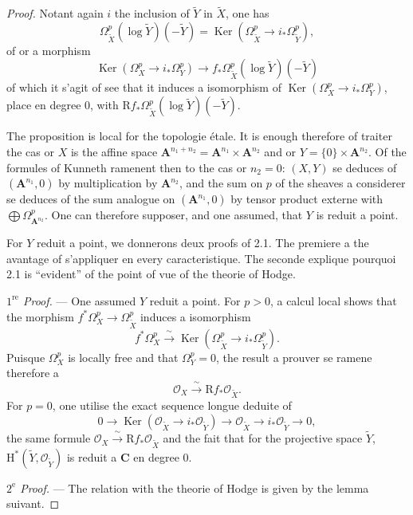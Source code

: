 \documentclass[12pt,a4paper]{article}
\theoremstyle{plain}
\theoremstyle{definition}
\DeclareMathOperator{\Ker}{Ker}
\begin{document}
\begin{proof}[Proof]
Notant again $i$ the inclusion of $\tilde{Y}$ in $\tilde{X}$, one has
\[
\Omega_{\tilde{X}}^p(\log \tilde{Y})(-\tilde{Y}) = \Ker(\Omega_{\tilde{X}}^p \to i_* \Omega_{\tilde{Y}}^p),
\]
of or a morphism
\[
\Ker(\Omega_X^p \to i_* \Omega_Y^p) \to f_* \Omega_{\tilde{X}}^p(\log \tilde{Y})(-\tilde{Y})
\]
of which it s'agit of see that it induces a isomorphism of $\Ker(\Omega_X^p \to i_* \Omega_Y^p)$, place en degree 0, with $\mathrm{R}f_* \Omega_{\tilde{X}}^p(\log \tilde{Y})(-\tilde{Y})$.

The proposition is local for the topologie étale. It is enough therefore of traiter the cas or $X$ is the affine space $\mathbf{A}^{n_1+n_2} = \mathbf{A}^{n_1} \times \mathbf{A}^{n_2}$ and or $Y = \{0\} \times \mathbf{A}^{n_2}$. Of the formules of Kunneth ramenent then to the cas or $n_2 = 0$: $(X, Y)$ se deduces of $(\mathbf{A}^{n_1}, 0)$ by multiplication by $\mathbf{A}^{n_2}$, and the sum on $p$ of the sheaves a considerer se deduces of the sum analogue on $(\mathbf{A}^{n_1}, 0)$ by tensor product externe with $\bigoplus \Omega_{\mathbf{A}^{n_2}}^p$. One can therefore supposer, and one assumed, that $Y$ is reduit a point.

For $Y$ reduit a point, we donnerons deux proofs of 2.1. The premiere a the avantage of s'appliquer en every caracteristique. The seconde explique pourquoi 2.1 is ``evident'' of the point of vue of the theorie of Hodge.

\smallskip
\textit{$1^{\text{re}}$ Proof.} --- One assumed $Y$ reduit a point. For $p > 0$, a calcul local shows that the morphism $f^* \Omega_X^p \to \Omega_{\tilde{X}}^p$ induces a isomorphism
\[
f^* \Omega_X^p \xrightarrow{\;\sim\;} \Ker(\Omega_{\tilde{X}}^p \to i_* \Omega_{\tilde{Y}}^p).
\]
Puisque $\Omega_X^p$ is locally free and that $\Omega_Y^p = 0$, the result a prouver se ramene therefore a
\[
\mathscr{O}_X \xrightarrow{\;\sim\;} \mathrm{R}f_* \mathscr{O}_{\tilde{X}}.
\]
For $p = 0$, one utilise the exact sequence longue deduite of
\[
0 \to \Ker(\mathscr{O}_{\tilde{X}} \to i_* \mathscr{O}_{\tilde{Y}}) \to \mathscr{O}_{\tilde{X}} \to i_* \mathscr{O}_{\tilde{Y}} \to 0,
\]
the same formule $\mathscr{O}_X \xrightarrow{\;\sim\;} \mathrm{R}f_* \mathscr{O}_{\tilde{X}}$ and the fait that for the projective space $\tilde{Y}$, $\mathrm{H}^*(\tilde{Y}, \mathscr{O}_{\tilde{Y}})$ is reduit a $\mathbf{C}$ en degree 0.

\smallskip
\textit{$2^{\text{e}}$ Proof.} --- The relation with the theorie of Hodge is given by the lemma suivant.


\end{proof}
\end{document}

